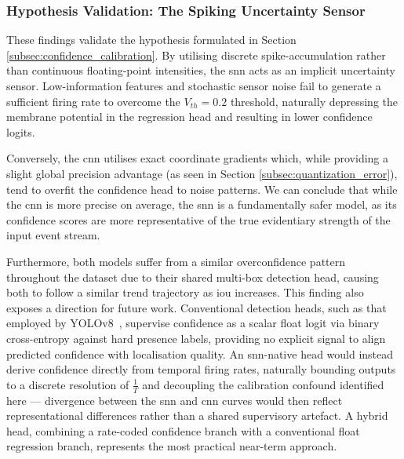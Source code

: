 \subsubsection*{Hypothesis Validation: The Spiking Uncertainty Sensor}

These findings validate the hypothesis formulated in Section \ref{subsec:confidence_calibration}. By utilising discrete spike-accumulation rather than continuous floating-point intensities, the \gls{snn} acts as an implicit uncertainty sensor. Low-information features and stochastic sensor noise fail to generate a sufficient firing rate to overcome the $V_{th}=0.2$ threshold, naturally depressing the membrane potential in the regression head and resulting in lower confidence logits. 

Conversely, the \gls{cnn} utilises exact coordinate gradients which, while providing a slight global precision advantage (as seen in Section \ref{subsec:quantization_error}), tend to overfit the confidence head to noise patterns. We can conclude that while the \gls{cnn} is more precise on average, the \gls{snn} is a fundamentally safer model, as its confidence scores are more representative of the true evidentiary strength of the input event stream.

Furthermore, both models suffer from a similar overconfidence pattern throughout the dataset due to their shared multi-box detection head, causing both to follow a similar trend trajectory as \gls{iou} increases.
This finding also exposes a direction for future work. 
Conventional detection heads, such as that employed by YOLOv8~\cite{yolov8_ultralytics}, supervise confidence as a 
scalar float logit via binary cross-entropy against hard presence labels, providing no explicit signal to align predicted confidence with localisation quality. 
An \gls{snn}-native head would instead derive confidence directly from temporal firing 
rates, naturally bounding outputs to a discrete resolution of $\frac{1}{T}$ and 
decoupling the calibration confound identified here --- divergence between the 
\gls{snn} and \gls{cnn} curves would then reflect representational differences rather 
than a shared supervisory artefact. 
A hybrid head, combining a rate-coded confidence branch with a conventional float 
regression branch, represents the most practical near-term approach.

